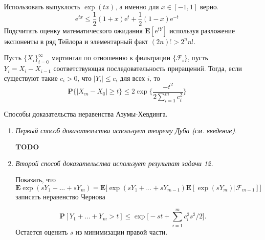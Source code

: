 \begin{remark}
Использовать выпуклость $\exp(tx)$, а именно для $x\in[-1,1]$ верно.
\begin{equation*}
\text{e}^{tx}\leq \frac{1}{2}(1+x)\text{e}^{t} +\frac{1}{2}(1-x)\text{e}^{-t}
\end{equation*}
Подсчитать оценку математического ожидания $\mathbf{E}[\text{e}^{tY}]$ используя разложение экспоненты в ряд Тейлора и элементарный факт $(2n)!>2^nn!$.  
\end{remark}

\begin{problem}

Пусть $\{X_i\}_{i=0}^{\infty}$ мартингал по отношению к фильтрации $\{\mathcal{F}_i\}$, пусть $Y_i = X_i-X_{i-1}$ соответствующая последовательность приращений. Тогда, если существуют такие $c_i>0$, что $|Y_i|\leq c_i$ для всех $i$, то 
\begin{equation*}
\mathbf{P}\{|X_m-X_0|\geq t\}\leq 2\exp\bigg\{\frac{-t^2}{2\sum_{i=1}^{m}c^2_i}\biggl\}
\end{equation*}
\end{problem}

\begin{remark} Способы доказательства неравенства Азумы-Хевдинга. 
\medskip
\begin{enumerate}

\item \textit{Первый способ доказательства использует теорему Дуба (см. введение).} 

\textbf{TODO}


\item \textit{Второй способ доказательства использует результат задачи 12.}

Показать, что 
\begin{equation*}
\mathbf{E}\exp(sY_1+\dots+ sY_m) = \mathbf{E}\big[\exp(sY_1+\dots+sY_{m-1})\mathbf{E}[\exp(sY_m)|\mathcal{F}_{m-1}]\bigl] 
\end{equation*}
записать неравенство Чернова

\begin{equation*}
\mathbf{P}[Y_1+\dots+Y_m>t]\leq \exp\big[-st+\sum_{i=1}^mc^2_i s^2/2\bigr].
\end{equation*}
Остается оценить $s$ из минимизации правой части.
\end{enumerate}

\end{remark}



